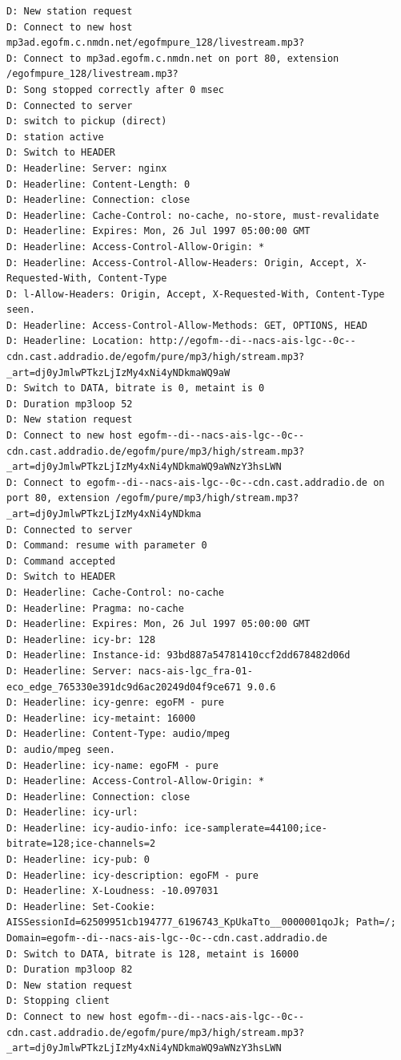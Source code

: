 \documentclass[ngerman,11pt,parskip=half] {scrartcl}
\begin{document}
\begin{lstlisting}
D: New station request
D: Connect to new host mp3ad.egofm.c.nmdn.net/egofmpure_128/livestream.mp3?
D: Connect to mp3ad.egofm.c.nmdn.net on port 80, extension /egofmpure_128/livestream.mp3?
D: Song stopped correctly after 0 msec
D: Connected to server
D: switch to pickup (direct)
D: station active
D: Switch to HEADER
D: Headerline: Server: nginx
D: Headerline: Content-Length: 0
D: Headerline: Connection: close
D: Headerline: Cache-Control: no-cache, no-store, must-revalidate
D: Headerline: Expires: Mon, 26 Jul 1997 05:00:00 GMT
D: Headerline: Access-Control-Allow-Origin: *
D: Headerline: Access-Control-Allow-Headers: Origin, Accept, X-Requested-With, Content-Type
D: l-Allow-Headers: Origin, Accept, X-Requested-With, Content-Type seen.
D: Headerline: Access-Control-Allow-Methods: GET, OPTIONS, HEAD
D: Headerline: Location: http://egofm--di--nacs-ais-lgc--0c--cdn.cast.addradio.de/egofm/pure/mp3/high/stream.mp3?_art=dj0yJmlwPTkzLjIzMy4xNi4yNDkmaWQ9aW
D: Switch to DATA, bitrate is 0, metaint is 0
D: Duration mp3loop 52
D: New station request
D: Connect to new host egofm--di--nacs-ais-lgc--0c--cdn.cast.addradio.de/egofm/pure/mp3/high/stream.mp3?_art=dj0yJmlwPTkzLjIzMy4xNi4yNDkmaWQ9aWNzY3hsLWN
D: Connect to egofm--di--nacs-ais-lgc--0c--cdn.cast.addradio.de on port 80, extension /egofm/pure/mp3/high/stream.mp3?_art=dj0yJmlwPTkzLjIzMy4xNi4yNDkma
D: Connected to server
D: Command: resume with parameter 0
D: Command accepted
D: Switch to HEADER
D: Headerline: Cache-Control: no-cache
D: Headerline: Pragma: no-cache
D: Headerline: Expires: Mon, 26 Jul 1997 05:00:00 GMT
D: Headerline: icy-br: 128
D: Headerline: Instance-id: 93bd887a54781410ccf2dd678482d06d
D: Headerline: Server: nacs-ais-lgc_fra-01-eco_edge_765330e391dc9d6ac20249d04f9ce671 9.0.6
D: Headerline: icy-genre: egoFM - pure
D: Headerline: icy-metaint: 16000
D: Headerline: Content-Type: audio/mpeg
D: audio/mpeg seen.
D: Headerline: icy-name: egoFM - pure
D: Headerline: Access-Control-Allow-Origin: *
D: Headerline: Connection: close
D: Headerline: icy-url:  
D: Headerline: icy-audio-info: ice-samplerate=44100;ice-bitrate=128;ice-channels=2
D: Headerline: icy-pub: 0
D: Headerline: icy-description: egoFM - pure
D: Headerline: X-Loudness: -10.097031
D: Headerline: Set-Cookie: AISSessionId=62509951cb194777_6196743_KpUkaTto__0000001qoJk; Path=/; Domain=egofm--di--nacs-ais-lgc--0c--cdn.cast.addradio.de
D: Switch to DATA, bitrate is 128, metaint is 16000
D: Duration mp3loop 82
D: New station request
D: Stopping client
D: Connect to new host egofm--di--nacs-ais-lgc--0c--cdn.cast.addradio.de/egofm/pure/mp3/high/stream.mp3?_art=dj0yJmlwPTkzLjIzMy4xNi4yNDkmaWQ9aWNzY3hsLWN

\end{lstlisting}
\end{document}
